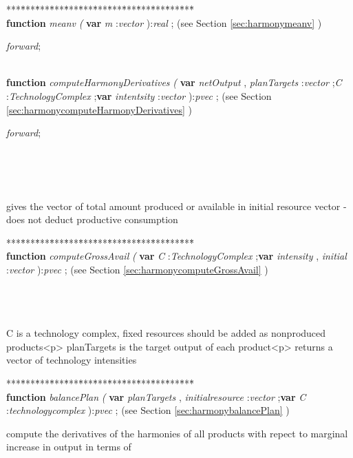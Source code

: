 \begin{tabbing}
***\=***\=***\=***\=***\=***\=***\=***\=***\=***\=***\=***\=***\=\kill
\+ \+ \\
\<\textsf{\textbf{function}  \textit{meanv} \textit{(} \textbf{var}  \textit{m} :\textit{vector}   ):\textit{real} ;} (see Section \ref{sec:harmonymeanv} )\\
\parbox{14cm}{\textsf{\textit{forward}}; }\\
\<\textsf{\textbf{function}  \textit{computeHarmonyDerivatives} \textit{(} \textbf{var}  \textit{netOutput} , \textit{planTargets} :\textit{vector} ;\textit{C} :\textit{TechnologyComplex} ;\textbf{var}  \textit{intentsity} :\textit{vector} ):\textit{pvec}  ;} (see Section \ref{sec:harmonycomputeHarmonyDerivatives} )\\
\parbox{14cm}{\textsf{\textit{forward}}; }\\
\\
\\
\end{tabbing}
gives the vector of total amount produced or available in initial resource vector - does not deduct productive consumption
\begin{tabbing}
***\=***\=***\=***\=***\=***\=***\=***\=***\=***\=***\=***\=***\=\kill
\+ \+ \\
\<\textsf{\textbf{function}  \textit{computeGrossAvail} \textit{(} \textbf{var}  \textit{C} :\textit{TechnologyComplex}  ;\textbf{var}     \textit{intensity} , \textit{initial} :\textit{vector} ):\textit{pvec} ;} (see Section \ref{sec:harmonycomputeGrossAvail} )\\
\\
\\
\\
\end{tabbing}
C is a technology complex, fixed resources should be added as nonproduced products<p>
planTargets is the target output of each product<p>
returns a vector of technology intensities
\begin{tabbing}
***\=***\=***\=***\=***\=***\=***\=***\=***\=***\=***\=***\=***\=\kill
\+ \+ \\
\<\textsf{\textbf{function}  \textit{balancePlan} \textit{(}   \textbf{var}   \textit{planTargets} , \textit{initialresource} :\textit{vector}  ;\textbf{var}  \textit{C} :\textit{technologycomplex} ):\textit{pvec} ;} (see Section \ref{sec:harmonybalancePlan} )\\
\end{tabbing}
compute the derivatives of the harmonies of all products with repect to marginal increase in output in terms of

